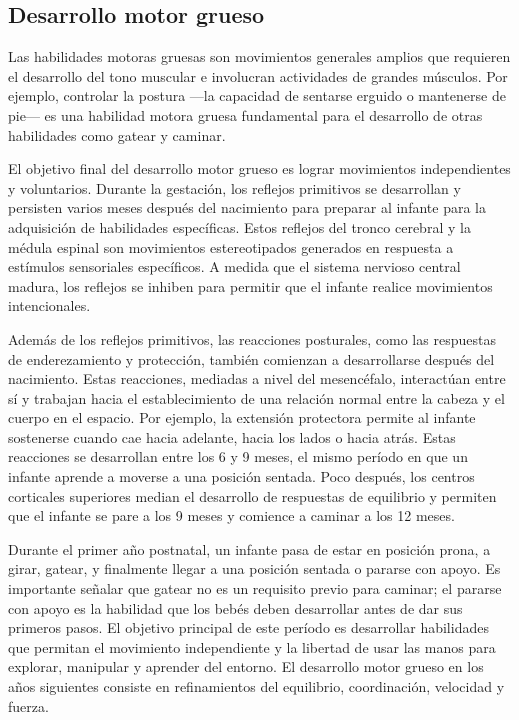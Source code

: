 \documentclass[11pt,letterpaper]{report}
\begin{document}
\subsection{Desarrollo motor grueso}
Las habilidades motoras gruesas son movimientos generales amplios que requieren
el desarrollo del tono muscular e involucran actividades de grandes músculos.
Por ejemplo, controlar la postura —la capacidad de sentarse erguido o
mantenerse de pie— es una habilidad motora gruesa fundamental para el
desarrollo de otras habilidades como gatear y caminar. \cite{Lorentz2021}

El objetivo final del desarrollo motor grueso es lograr movimientos
independientes y voluntarios. Durante la gestación, los reflejos primitivos se
desarrollan y persisten varios meses después del nacimiento para preparar al
infante para la adquisición de habilidades específicas. Estos reflejos del
tronco cerebral y la médula espinal son movimientos estereotipados generados en
respuesta a estímulos sensoriales específicos. A medida que el sistema nervioso
central madura, los reflejos se inhiben para permitir que el infante realice
movimientos intencionales. \cite{Gerber2010}

Además de los reflejos primitivos, las reacciones posturales, como las
respuestas de enderezamiento y protección, también comienzan a desarrollarse
después del nacimiento. Estas reacciones, mediadas a nivel del mesencéfalo,
interactúan entre sí y trabajan hacia el establecimiento de una relación normal
entre la cabeza y el cuerpo en el espacio. Por ejemplo, la extensión
protectora permite al infante sostenerse cuando cae hacia adelante, hacia los
lados o hacia atrás. Estas reacciones se desarrollan entre los 6 y 9 meses, el
mismo período en que un infante aprende a moverse a una posición sentada. Poco
después, los centros corticales superiores median el desarrollo de respuestas
de equilibrio y permiten que el infante se pare a los 9 meses y comience a
caminar a los 12 meses. \cite{Gerber2010}

Durante el primer año postnatal, un infante pasa de estar en posición prona, a
girar, gatear, y finalmente llegar a una posición sentada o pararse con apoyo.
Es importante señalar que gatear no es un requisito previo para caminar; el
pararse con apoyo es la habilidad que los bebés deben desarrollar antes de dar
sus primeros pasos. El objetivo principal de este período es desarrollar
habilidades que permitan el movimiento independiente y la libertad de usar las
manos para explorar, manipular y aprender del entorno. El desarrollo motor
grueso en los años siguientes consiste en refinamientos del equilibrio,
coordinación, velocidad y fuerza. \cite{Gerber2010}
\end{document}
